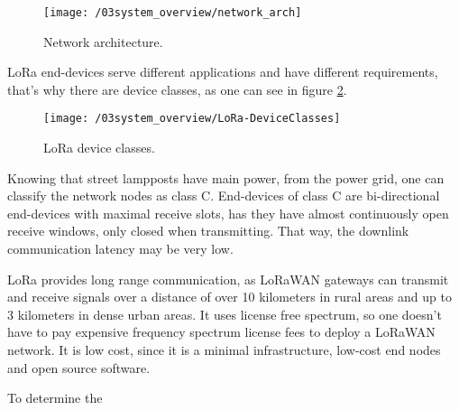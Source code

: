 \begin{figure}[ht]
	\centering
	\texttt{[image: /03system\_overview/network\_arch]}
	\caption{Network architecture.}
	\label{fig:network_arch}
\end{figure}
\clearpage

LoRa end-devices serve different applications and have different requirements, that's why there are device classes, as one can see in figure \ref{fig:lora_device_classes}.

\begin{figure}[ht]
	\centering
	\texttt{[image: /03system\_overview/LoRa-DeviceClasses]}
	\caption{LoRa device classes.}
	\label{fig:lora_device_classes}
\end{figure}

Knowing that street lampposts have main power, from the power grid, one can classify the network nodes as class C. End-devices of class C are bi-directional end-devices with maximal receive slots, has they have almost continuously open receive windows, only closed when transmitting. That way, the downlink communication latency may be very low. \cite{what_is_lorawan}

LoRa provides long range communication, as LoRaWAN gateways can transmit and receive signals over a distance of over 10 kilometers in rural areas and up to 3 kilometers in dense urban areas. It uses license free spectrum, so one doesn't have to pay expensive frequency spectrum license fees to deploy a LoRaWAN network. It is low cost, since it is a minimal infrastructure, low-cost end nodes and open source software. 

To determine the


